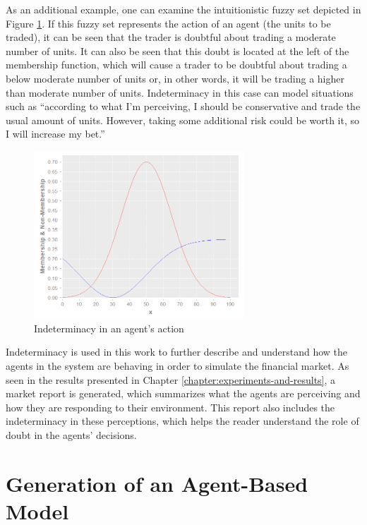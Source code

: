 As an additional example, one can examine the intuitionistic fuzzy set depicted
in Figure \ref{figure:indeterminacy-in-an-agents-action}. If this fuzzy set
represents the action of an agent (the units to be traded), it can be seen that
the trader is doubtful about trading a moderate number of units. It can also be
seen that this doubt is located at the left of the membership function, which
will cause a trader to be doubtful about trading a below moderate number of
units or, in other words, it will be trading a higher than moderate number of
units. Indeterminacy in this case can model situations such as ``according to
what I'm perceiving, I should be conservative and trade the usual amount of
units. However, taking some additional risk could be worth it, so I will
increase my bet.''

\begin{figure}
\centering
\includegraphics[width=0.7\textwidth]{img/example-of-ifs.png}
\caption{Indeterminacy in an agent's action}
\label{figure:indeterminacy-in-an-agents-action}
\end{figure}

Indeterminacy is used in this work to further describe and understand how the
agents in the system are behaving in order to simulate the financial market. As
seen in the results presented in Chapter \ref{chapter:experiments-and-results}, a market
report is generated, which summarizes what the agents are perceiving and how
they are responding to their environment. This report also includes the
indeterminacy in these perceptions, which helps the reader understand the role
of doubt in the agents' decisions.

\section{Generation of an Agent-Based Model}
\label{section:generation-of-an-agent-based-model}

